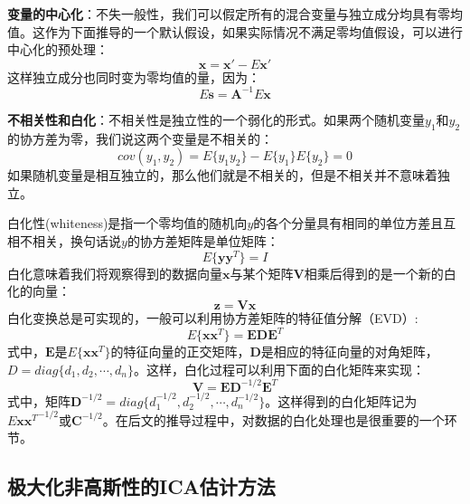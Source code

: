 \textbf{变量的中心化}：不失一般性，我们可以假定所有的混合变量与独立成分均具有零均值。这作为下面推导的一个默认假设，如果实际情况不满足零均值假设，可以进行中心化的预处理：
\begin{equation} 
    \mathbf{x}=\mathbf{x'}-E{\mathbf{x'}}
\end{equation}
这样独立成分也同时变为零均值的量，因为：
\begin{equation}
    E{\mathbf{s}}=\mathbf{A}^{-1}E{\mathbf{x}}
\end{equation}

\textbf{不相关性和白化}：不相关性是独立性的一个弱化的形式。如果两个随机变量$y_1$和$y_2$的协方差为零，我们说这两个变量是不相关的：
\begin{equation}
    cov(y_1,y_2)=E\{y_1y_2\}-E\{y_1\}E\{y_2\}=0
\end{equation}
如果随机变量是相互独立的，那么他们就是不相关的，但是不相关并不意味着独立。

白化性(whiteness)是指一个零均值的随机向$y$的各个分量具有相同的单位方差且互相不相关，换句话说$y$的协方差矩阵是单位矩阵：
\begin{equation}
    E\{\textbf{yy}^T\}=\mathbf{\mathit{I}}
\end{equation}
白化意味着我们将观察得到的数据向量$\mathbf{x}$与某个矩阵$\mathbf{V}$相乘后得到的是一个新的白化的向量：
\begin{equation}
    \mathbf{z}=\mathbf{Vx}
\end{equation}
白化变换总是可实现的，一般可以利用协方差矩阵的特征值分解（EVD）:
\begin{equation}
    E\{\textbf{xx}^T \}=\textbf{EDE}^T
\end{equation}
式中，$\mathbf{E}$是$E\{\mathbf{xx}^T \}$的特征向量的正交矩阵，$\textbf{D}$是相应的特征向量的对角矩阵，$D=diag\{d_1,d_2,\cdots,d_n\}$。这样，白化过程可以利用下面的白化矩阵来实现：
\begin{equation}
    \mathbf{V}=\mathbf{E}\mathbf{D}^{-1/2}\mathbf{E}^T
\end{equation}
式中，矩阵$\mathbf{D}^{-1/2}=diag\{d_1^{-1/2},d_2^{-1/2},\cdots,d_n^{-1/2}\}$。这样得到的白化矩阵记为$E{\mathbf{xx}^T}^{-1/2}$或$\mathbf{C}^{-1/2}$。在后文的推导过程中，对数据的白化处理也是很重要的一个环节。


\subsection{极大化非高斯性的ICA估计方法}


